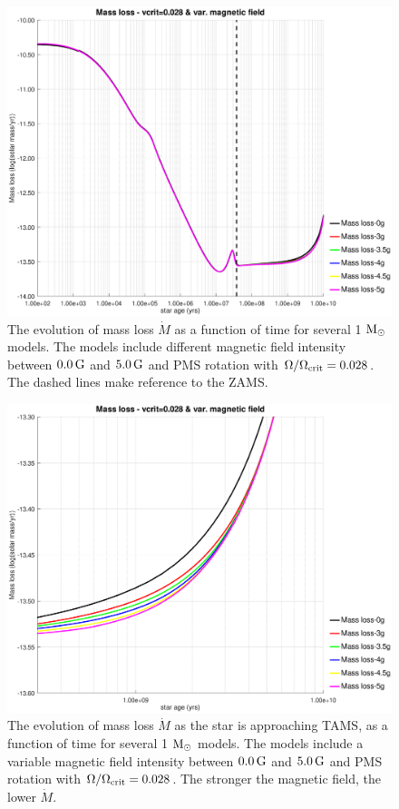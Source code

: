 \documentclass[fleqn,usenatbib]{mnras}
\begin{document}
\begin{figure}
	\includegraphics[trim = 30mm 15mm 20mm 15mm, clip,width=\columnwidth]{figures/mdot_vc_028_var_g.eps}
    \caption{The evolution of mass loss $\Dot{M}$ as a function of time for several 1 $\mathrm{M}_\odot$ models. The models include different magnetic field intensity between $0.0\,\mathrm{G}$ and $5.0\,\mathrm{G}$ and PMS rotation with $\Omega / \Omega_{\mathrm{crit}}=0.028$. The dashed lines make reference to the ZAMS.}
    \label{fig:mdot_vc_028_var_b}
\end{figure}

\begin{figure}
	\includegraphics[trim = 30mm 15mm 20mm 15mm, clip,width=\columnwidth]{figures/mdot_vc_028_var_g_z1.eps}
    \caption{The evolution of mass loss $\Dot{M}$ as the star is approaching TAMS, as a function of time for several 1 $\mathrm{M}_\odot$ models. The models include a variable magnetic field intensity between $0.0\,\mathrm{G}$ and $5.0\,\mathrm{G}$ and PMS rotation with $\Omega / \Omega_{\mathrm{crit}}=0.028$. The stronger the magnetic field, the lower $\Dot{M}$.}
    \label{fig:mdot_vc_028_var_b_z1}
\end{figure}
\end{document}
